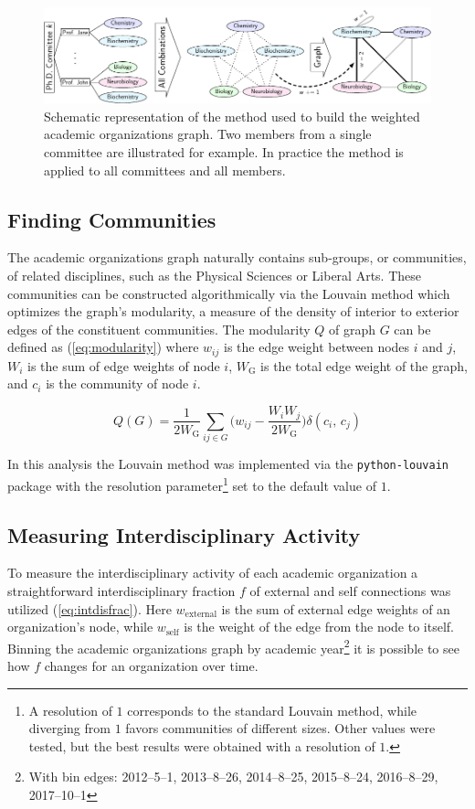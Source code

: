 \documentclass[notitlepage,aps,prd,nofootinbib]{revtex4-1}
\begin{document}
\begin{figure}[!htb]\centering
  \includegraphics[width=\textwidth]{../poster/tikzout/vis_challenge_2018_poster-matthew_epland-figure0.pdf}
  \caption{Schematic representation of the method used to build the weighted academic organizations graph. Two members from a single committee are illustrated for example. In practice the method is applied to all committees and all members.}
  \label{fig:method_schematic}
\end{figure}


\subsection{Finding Communities}
The academic organizations graph naturally contains sub-groups, or communities, of related disciplines, such as the Physical Sciences or Liberal Arts. These communities can be constructed algorithmically via the Louvain method \cite{louvain} which optimizes the graph's modularity, a measure of the density of interior to exterior edges of the constituent communities. The modularity $Q$ of graph $G$ can be defined as (\ref{eq:modularity}) where $w_{ij}$ is the edge weight between nodes $i$ and $j$, $W_{i}$ is the sum of edge weights of node $i$, $W_{\mathrm{G}}$ is the total edge weight of the graph, and $c_{i}$ is the community of node $i$.

\begin{equation} \label{eq:modularity}
Q\left(G\right) = \frac{1}{2 W_{\mathrm{G}}} \sum_{ij \in G} \bigg(w_{ij} - \frac{W_{i} W_{j}}{2 W_{\mathrm{G}}}\bigg) \delta\left(c_{i},\,c_{j}\right)
\end{equation}

In this analysis the Louvain method was implemented via the \texttt{python-louvain} package \cite{python-louvain} with the resolution parameter\footnote{A resolution of $1$ corresponds to the standard Louvain method, while diverging from $1$ favors communities of different sizes. Other values were tested, but the best results were obtained with a resolution of $1$.} set to the default value of $1$.


\subsection{Measuring Interdisciplinary Activity}
To measure the interdisciplinary activity of each academic organization a straightforward interdisciplinary fraction $f$ of external and self connections was utilized (\ref{eq:intdisfrac}). Here $w_{\text{external}}$ is the sum of external edge weights of an organization's node, while $w_{\text{self}}$ is the weight of the edge from the node to itself. Binning the academic organizations graph by academic year\footnote{With bin edges: 2012--5--1, 2013--8--26, 2014--8--25, 2015--8--24, 2016--8--29, 2017--10--1} it is possible to see how $f$ changes for an organization over time.
\end{document}
